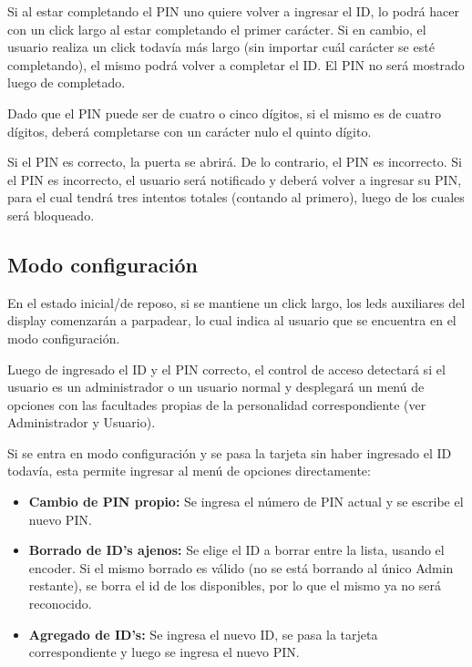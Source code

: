 \documentclass[10pt,a4paper]{article}
\begin{document}
Si al estar completando el PIN uno quiere volver a ingresar el ID, lo podrá hacer con un click largo al estar completando el primer carácter. Si en cambio, el usuario realiza un click todavía más largo (sin importar cuál carácter se esté completando), el mismo podrá volver a completar el ID. El PIN no será mostrado luego de completado.\par
Dado que el PIN puede ser de cuatro o cinco dígitos, si el mismo es de cuatro dígitos, deberá completarse con un carácter nulo el quinto dígito. \par
Si el PIN es correcto, la puerta se abrirá. De lo contrario, el PIN es incorrecto. Si el PIN es incorrecto, el usuario será notificado y deberá volver a ingresar su PIN, para el cual tendrá tres intentos totales (contando al primero), luego de los cuales será bloqueado.\par

\subsection{Modo configuración}
En el estado inicial/de reposo, si se mantiene un click largo, los leds auxiliares del display comenzarán a parpadear, lo cual indica al usuario que se encuentra en el modo configuración.\par
Luego de ingresado el ID y el PIN correcto, el control de acceso detectará si el usuario es un administrador o un usuario normal y desplegará un menú de opciones con las facultades propias de la personalidad correspondiente (ver Administrador y Usuario).\par
Si se entra en modo configuración y se pasa la tarjeta sin haber ingresado el ID todavía, esta permite ingresar al menú de opciones directamente:
\begin{itemize}
\item \textbf{Cambio de PIN propio: } Se ingresa el número de PIN actual y se escribe el nuevo PIN.
\item \textbf{Borrado de ID's ajenos: } Se elige el ID a borrar entre la lista, usando el encoder. Si el mismo borrado es válido (no se está borrando al único Admin restante), se borra el id de los disponibles, por lo que el mismo ya no será reconocido.
\item \textbf{Agregado de ID's: } Se ingresa el nuevo ID, se pasa la tarjeta correspondiente y luego se ingresa el nuevo PIN.
\end{itemize}
\end{document}
